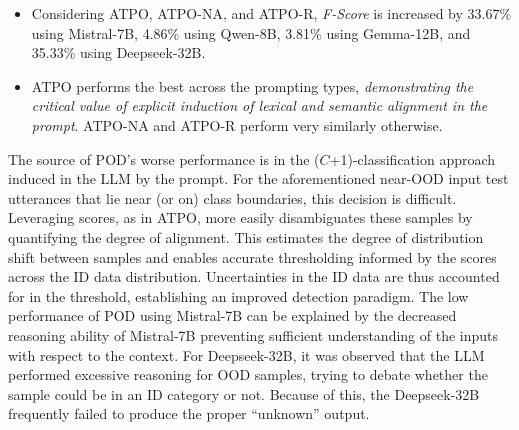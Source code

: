 \begin{itemize}
    \item Considering ATPO, ATPO-NA, and ATPO-R, \textit{F-Score} is increased by 33.67\% using Mistral-7B, 
    4.86\% using Qwen-8B, 3.81\% using Gemma-12B, and 35.33\% using Deepseek-32B.
    \item ATPO performs the best across the prompting types, \textit{demonstrating the critical value of explicit induction of lexical and semantic alignment in the prompt}. ATPO-NA and ATPO-R perform very similarly otherwise.
\end{itemize}
The source of POD's worse performance is in the ($C$+1)-classification approach induced in the LLM by the prompt. For the aforementioned near-OOD input test utterances that lie near (or on) class boundaries, this decision is difficult. Leveraging scores, as in ATPO, more easily disambiguates these samples by quantifying the degree of alignment. This estimates the degree of distribution shift between samples and enables accurate thresholding informed by the scores across the ID data distribution. Uncertainties in the ID data are thus accounted for in the threshold, establishing an improved detection paradigm. The low performance of POD using Mistral-7B can be explained by the decreased reasoning ability of Mistral-7B preventing sufficient understanding of the inputs with respect to the context. For Deepseek-32B, it was observed that the LLM performed excessive reasoning for OOD samples, trying to debate whether the sample could be in an ID category or not. Because of this, the Deepseek-32B frequently failed to produce the proper ``unknown'' output.

